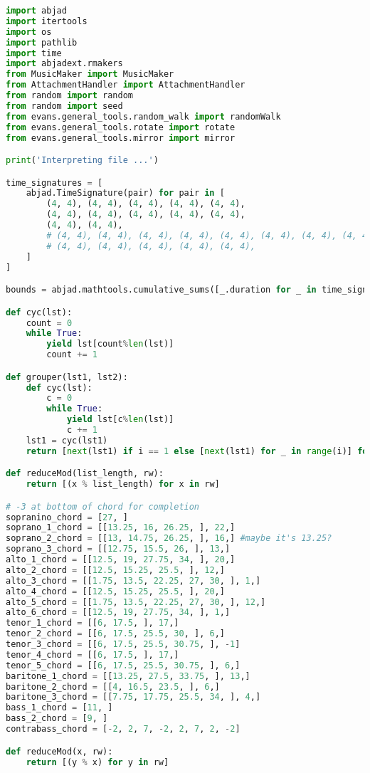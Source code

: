 \begin{lstlisting}[language=Python, caption=Invocation Source Code]
import abjad
import itertools
import os
import pathlib
import time
import abjadext.rmakers
from MusicMaker import MusicMaker
from AttachmentHandler import AttachmentHandler
from random import random
from random import seed
from evans.general_tools.random_walk import randomWalk
from evans.general_tools.rotate import rotate
from evans.general_tools.mirror import mirror

print('Interpreting file ...')

time_signatures = [
    abjad.TimeSignature(pair) for pair in [
        (4, 4), (4, 4), (4, 4), (4, 4), (4, 4),
        (4, 4), (4, 4), (4, 4), (4, 4), (4, 4),
        (4, 4), (4, 4),
        # (4, 4), (4, 4), (4, 4), (4, 4), (4, 4), (4, 4), (4, 4), (4, 4),
        # (4, 4), (4, 4), (4, 4), (4, 4), (4, 4),
    ]
]

bounds = abjad.mathtools.cumulative_sums([_.duration for _ in time_signatures])

def cyc(lst):
    count = 0
    while True:
        yield lst[count%len(lst)]
        count += 1

def grouper(lst1, lst2):
    def cyc(lst):
        c = 0
        while True:
            yield lst[c%len(lst)]
            c += 1
    lst1 = cyc(lst1)
    return [next(lst1) if i == 1 else [next(lst1) for _ in range(i)] for i in lst2]

def reduceMod(list_length, rw):
    return [(x % list_length) for x in rw]

# -3 at bottom of chord for completion
sopranino_chord = [27, ]
soprano_1_chord = [[13.25, 16, 26.25, ], 22,]
soprano_2_chord = [[13, 14.75, 26.25, ], 16,] #maybe it's 13.25?
soprano_3_chord = [[12.75, 15.5, 26, ], 13,]
alto_1_chord = [[12.5, 19, 27.75, 34, ], 20,]
alto_2_chord = [[12.5, 15.25, 25.5, ], 12,]
alto_3_chord = [[1.75, 13.5, 22.25, 27, 30, ], 1,]
alto_4_chord = [[12.5, 15.25, 25.5, ], 20,]
alto_5_chord = [[1.75, 13.5, 22.25, 27, 30, ], 12,]
alto_6_chord = [[12.5, 19, 27.75, 34, ], 1,]
tenor_1_chord = [[6, 17.5, ], 17,]
tenor_2_chord = [[6, 17.5, 25.5, 30, ], 6,]
tenor_3_chord = [[6, 17.5, 25.5, 30.75, ], -1]
tenor_4_chord = [[6, 17.5, ], 17,]
tenor_5_chord = [[6, 17.5, 25.5, 30.75, ], 6,]
baritone_1_chord = [[13.25, 27.5, 33.75, ], 13,]
baritone_2_chord = [[4, 16.5, 23.5, ], 6,]
baritone_3_chord = [[7.75, 17.75, 25.5, 34, ], 4,]
bass_1_chord = [11, ]
bass_2_chord = [9, ]
contrabass_chord = [-2, 2, 7, -2, 2, 7, 2, -2]

def reduceMod(x, rw):
    return [(y % x) for y in rw]


\end{lstlisting}
